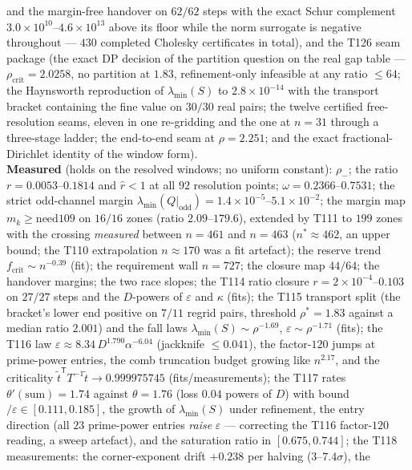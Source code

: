 \documentclass[11pt,a4paper]{article}
\begin{document}
\begin{keybox}
and the margin-free handover on $62/62$ steps with the exact Schur complement
$3.0\times10^{10}$--$4.6\times10^{13}$ above its floor while the norm surrogate is negative
throughout --- $430$ completed Cholesky certificates in total), and the T126 seam package (the
exact DP decision of the partition question on the real gap table --- $\rho_{\mathrm{crit}}=2.0258$,
no partition at $1.83$, refinement-only infeasible at any ratio $\le64$; the Haynsworth reproduction
of $\lambda_{\min}(S)$ to $2.8\times10^{-14}$ with the transport bracket containing the fine value
on $30/30$ real pairs; the twelve certified free-resolution seams, eleven in one re-gridding and the
one at $n=31$ through a three-stage ladder; the end-to-end seam at $\rho=2.251$; and the exact
fractional-Dirichlet identity of the window form).\\[3pt]
\textbf{Measured} (holds on the resolved windows; no uniform constant): $\rho_-$; the ratio
$r=0.0053$--$0.1814$ and $\hat r<1$ at all $92$ resolution points; $\omega=0.2366$--$0.7531$; the
strict odd-channel margin $\lambda_{\min}(Q|_{\mathrm{odd}})=1.4\times10^{-5}$--$5.1\times10^{-2}$; the
margin map $m_k\ge\mathrm{need109}$ on $16/16$ zones (ratio $2.09$--$179.6$), extended by T111 to
$199$ zones with the crossing \emph{measured} between $n=461$ and $n=463$ ($n^*\approx462$, an upper
bound; the T110 extrapolation $n\approx170$ was a fit artefact); the reserve trend
$f_{\mathrm{crit}}\sim n^{-0.39}$ (fit); the requirement wall $n=727$; the closure map $44/64$; the
handover margins; the two race slopes; the T114 ratio closure $r=2\times10^{-4}$--$0.103$ on
$27/27$ steps and the $D$-powers of $\varepsilon$ and $\kappa$ (fits); the T115 transport split
(the bracket's lower end positive on $7/11$ regrid pairs, threshold $\rho^*=1.83$ against a
median ratio $2.001$) and the fall laws $\lambda_{\min}(S)\sim\rho^{-1.69}$,
$\varepsilon\sim\rho^{-1.71}$ (fits); the T116 law
$\varepsilon\approx8.34\,D^{1.790}\alpha^{-6.04}$ (jackknife $\le0.041$), the factor-$120$
jumps at prime-power entries, the comb truncation budget growing like $n^{2.17}$, and the
criticality $\tilde t^{\mathsf T}T^{-1}\tilde t\to0.999975745$ (fits/measurements); the T117
rates $\theta'(\mathrm{sum})=1.74$ against $\theta=1.76$ (loss $0.04$ powers of $D$) with
bound$/\varepsilon\in[0.111,0.185]$, the growth of $\lambda_{\min}(S)$ under refinement, the
entry direction (all $23$ prime-power entries \emph{raise} $\varepsilon$ --- correcting the
T116 factor-$120$ reading, a sweep artefact), and the saturation ratio in $[0.675,0.744]$; the
T118 measurements: the corner-exponent drift $+0.238$ per halving ($3$--$7.4\sigma$), the

\end{keybox}
\end{document}
